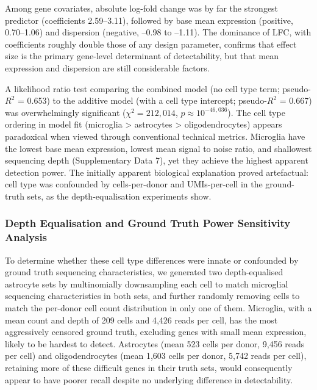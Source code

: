 \documentclass[
]{article}
\begin{document}
Among gene covariates, absolute log-fold change was by far the strongest
predictor (coefficients 2.59--3.11), followed by base mean expression
(positive, 0.70--1.06) and dispersion (negative, --0.98 to --1.11). The
dominance of \textbar LFC\textbar, with coefficients roughly double
those of any design parameter, confirms that effect size is the primary
gene-level determinant of detectability, but that mean expression and
dispersion are still considerable factors.

A likelihood ratio test comparing the combined model (no cell type term;
pseudo-\(R^2\) = 0.653) to the additive model (with a cell type
intercept; pseudo-\(R^2\) = 0.667) was overwhelmingly significant
(\(\chi^2 = 212{,}014\), \(p \approx 10^{-46{,}036}\)). The cell type
ordering in model fit (microglia \textgreater{} astrocytes
\textgreater{} oligodendrocytes) appears paradoxical when viewed through
conventional technical metrics. Microglia have the lowest base mean
expression, lowest mean signal to noise ratio, and shallowest sequencing
depth (Supplementary Data 7), yet they achieve the highest apparent
detection power. The initially apparent biological explanation proved
artefactual: cell type was confounded by cells-per-donor and
UMIs-per-cell in the ground-truth sets, as the depth-equalisation
experiments show.

\subsubsection{Depth Equalisation and Ground Truth Power Sensitivity
Analysis}\label{depth-equalisation-and-ground-truth-power-sensitivity-analysis}

To determine whether these cell type differences were innate or
confounded by ground truth sequencing characteristics, we generated two
depth-equalised astrocyte sets by multinomially downsampling each cell
to match microglial sequencing characteristics in both sets, and further
randomly removing cells to match the per-donor cell count distribution
in only one of them. Microglia, with a mean count and depth of 209 cells
and 4,426 reads per cell, has the most aggressively censored ground
truth, excluding genes with small mean expression, likely to be hardest
to detect. Astrocytes (mean 523 cells per donor, 9,456 reads per cell)
and oligodendrocytes (mean 1,603 cells per donor, 5,742 reads per cell),
retaining more of these difficult genes in their truth sets, would
consequently appear to have poorer recall despite no underlying
difference in detectability.
\end{document}
